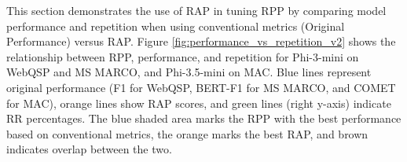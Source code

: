 %

This section demonstrates the use of RAP in tuning RPP by comparing model performance and repetition when using conventional metrics (Original Performance) versus RAP. Figure \ref{fig:performance_vs_repetition_v2} shows the relationship between RPP, performance, and repetition for Phi-3-mini on WebQSP and MS MARCO, and Phi-3.5-mini on MAC. Blue lines represent original performance (F1 for WebQSP, BERT-F1 for MS MARCO, and COMET for MAC), orange lines show RAP scores, and green lines (right y-axis) indicate RR percentages. The blue shaded area marks the RPP with the best performance based on conventional metrics, the orange marks the best RAP, and brown indicates overlap between the two.


